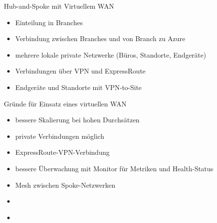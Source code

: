 \begin{flashcard}[]{Hub-and-Spoke mit Virtuellem WAN}
  \begin{itemize}
    \item Einteilung in Branches
    \item Verbindung zwischen Branches und von Branch zu Azure
    \item mehrere lokale private Netzwerke (Büros, Standorte, Endgeräte)
    \item Verbindungen über VPN und ExpressRoute
    \item Endgeräte und Standorte mit VPN-to-Site
  \end{itemize}
\end{flashcard}

\begin{flashcard}[]{Gründe für Einsatz eines virtuellen WAN}
  \begin{itemize}
    \item bessere Skalierung bei hohen Durchsätzen
    \item private Verbindungen möglich
    \item ExpressRoute-VPN-Verbindung
    \item bessere Überwachung mit Monitor für Metriken und Health-Status
    \item Mesh zwischen Spoke-Netzwerken
  \end{itemize}
\end{flashcard}


\begin{flashcard}[]{}
  \begin{itemize}
    \item 
  \end{itemize}
\end{flashcard}


\begin{flashcard}[]{}
  \begin{itemize}
    \item 
  \end{itemize}
\end{flashcard}

